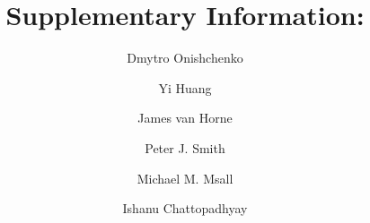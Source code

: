 \documentclass[3p,super,numbers,sort&compress,preprint,10pt]{elsarticle}
\begin{document}
\begin{frontmatter}
\title{{\Large\bf Supplementary Information:}\\\TITLE} 
\author[ad1]{Dmytro Onishchenko}
\author[ad1]{Yi Huang}
\author[ad1]{James van Horne}
\author[ad4,ad7]{Peter J. Smith}
\author[ad5,ad6]{Michael M. Msall}
\author[ad1,ad2,ad3]{Ishanu Chattopadhyay}

\address[ad1]{Department of Medicine, University of Chicago, Chicago, IL, USA}
\address[ad2]{Committee on Genetics, Genomics \& Systems Biology, University of Chicago, Chicago, IL, USA}
\address[ad3]{Committee on Quantitative Methods in Social, Behavioral, and Health Sciences, University of Chicago, Chicago, IL, USA}
\address[ad4]{Department of Pediatrics, Section of Developmental and Behavioral Pediatrics, University of Chicago, Chicago, IL, USA}
\address[ad5]{Department of Pediatrics, Section Chief of Developmental and Behavioral Pediatrics, University of Chicago, Chicago, IL, USA}
\address[ad6]{Joseph  P. Kennedy Research Center on Intellectual and Neurodevelopmental Disabilities, University of Chicago, Chicago, IL, USA}
\address[ad7]{Executive Committee Chair, American Academy of Pediatrics’ Section on Developmental and Behavioral Pediatrics}

\end{frontmatter}

\tableofcontents
\listoftables

\clearpage



\clearpage
\end{document}
